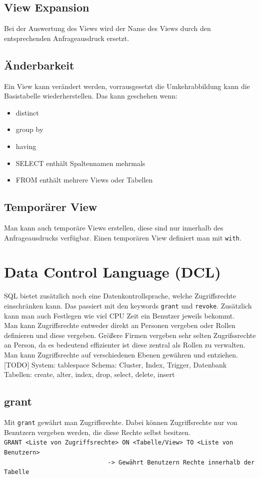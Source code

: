 \documentclass{article}
\begin{document}
	\subsection{View Expansion}
	Bei der Auswertung des Views wird der Name des Views durch den entsprechenden Anfrageausdruck ersetzt.
	\subsection{Änderbarkeit}
	Ein View kann verändert werden, vorrausgesetzt die Umkehrabbildung kann die Basistabelle wiederherstellen. Das kann geschehen wenn:
	\begin{itemize}
		\item{distinct}
		\item{group by}
		\item{having}
		\item{SELECT enthält Spaltennamen mehrmals}
		\item{FROM enthält mehrere Views oder Tabellen}
	\end{itemize}
	\subsection{Temporärer View}
	Man kann auch temporäre Views erstellen, diese sind nur innerhalb des Anfrageausdrucks verfügbar. Einen temporären View definiert man mit \verb|with|.
	\section{Data Control Language (DCL)}
	SQL bietet zusätzlich noch eine Datenkontrollsprache, welche Zugriffsrechte einschränken kann. Das passiert mit den keywords \verb|grant| und \verb|revoke|. Zusätzlich kann man auch Festlegen wie viel CPU Zeit ein Benutzer jeweils bekommt.\\
	Man kann Zugriffsrechte entweder direkt an Personen vergeben oder Rollen definieren und diese vergeben. Größere Firmen vergeben sehr selten Zugrifssrechte an Person, da es bedeutend effizienter ist diese zentral als Rollen zu verwalten. 
	Man kann Zugriffsrechte auf verschiedenen Ebenen gewähren und entziehen.
	[TODO]
	System: tablespace
	Schema: Cluster, Index, Trigger, Datenbank
	Tabellen: create, alter, index, drop, select, delete, insert
	\\
	\subsection{grant}
	Mit \verb|grant| gewährt man Zugriffsrechte. Dabei können Zugriffsrechte nur von Benutzern vergeben werden, die diese Rechte selbst besitzen. \\
	\verb|GRANT <Liste von Zugriffsrechte> ON <Tabelle/View> TO <Liste von Benutzern>| \\
	\verb|                             -> Gewährt Benutzern Rechte innerhalb der Tabelle|
\end{document}
